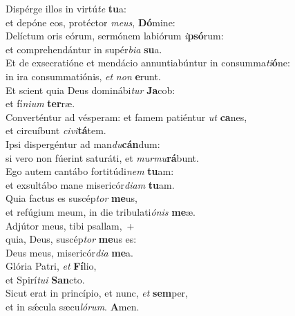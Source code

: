 \evenverse Dispérge illos in virtú\textit{te} \textbf{tu}a:~\*\\
\evenverse et depóne eos, protéctor \textit{me}\textit{us}, \textbf{Dó}mine:\\
\oddverse Delíctum oris eórum, sermónem labiórum \textit{i}\textbf{psó}rum:~\*\\
\oddverse et comprehendántur in supér\textit{bi}\textit{a} \textbf{su}a.\\
\evenverse Et de exsecratióne et mendácio annuntiabúntur in consumma\textit{ti}\textbf{ó}ne:~\*\\
\evenverse in ira consummatiónis, \textit{et} \textit{non} \textbf{e}runt.\\
\oddverse Et scient quia Deus dominábi\textit{tur} \textbf{Ja}cob:~\*\\
\oddverse et fí\textit{ni}\textit{um} \textbf{ter}ræ.\\
\evenverse Converténtur ad vésperam: et famem patiéntur \textit{ut} \textbf{ca}nes,~\*\\
\evenverse et circuíbunt \textit{ci}\textit{vi}\textbf{tá}tem.\\
\oddverse Ipsi dispergéntur ad man\textit{du}\textbf{cán}dum:~\*\\
\oddverse si vero non fúerint saturáti, et \textit{mur}\textit{mu}\textbf{rá}bunt.\\
\evenverse Ego autem cantábo fortitúdi\textit{nem} \textbf{tu}am:~\*\\
\evenverse et exsultábo mane misericór\textit{di}\textit{am} \textbf{tu}am.\\
\oddverse Quia factus es suscép\textit{tor} \textbf{me}us,~\*\\
\oddverse et refúgium meum, in die tribulati\textit{ó}\textit{nis} \textbf{me}æ.\\
\evenverse Adjútor meus, tibi psallam,~+\\
\evenverse  quia, Deus, suscép\textit{tor} \textbf{me}us es:~\*\\
\evenverse Deus meus, misericór\textit{di}\textit{a} \textbf{me}a.\\
\oddverse Glória Patri, \textit{et} \textbf{Fí}lio,~\*\\
\oddverse et Spirí\textit{tu}\textit{i} \textbf{San}cto.\\
\evenverse Sicut erat in princípio, et nunc, \textit{et} \textbf{sem}per,~\*\\
\evenverse et in sǽcula sæcu\textit{ló}\textit{rum}. \textbf{A}men.\\
